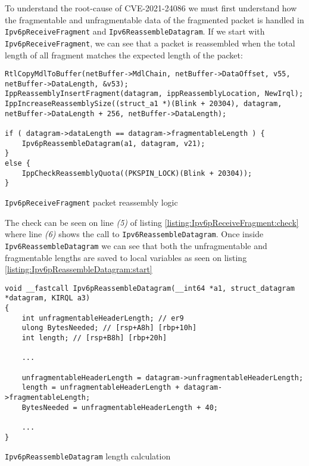 \documentclass{report}
\begin{document}
To understand the root-cause of CVE-2021-24086 we must first understand how the fragmentable and unfragmentable data of the fragmented packet is handled in \texttt{Ipv6pReceiveFragment} and \texttt{Ipv6ReassembleDatagram}. If we start with \texttt{Ipv6pReceiveFragment}, we can see that a packet is reassembled when the total length of all fragment matches the expected length of the packet:

\begin{listing}[H]
\begin{verbatim}
RtlCopyMdlToBuffer(netBuffer->MdlChain, netBuffer->DataOffset, v55, netBuffer->DataLength, &v53);
IppReassemblyInsertFragment(datagram, ippReassemblyLocation, NewIrql);
IppIncreaseReassemblySize((struct_a1 *)(Blink + 20304), datagram, netBuffer->DataLength + 256, netBuffer->DataLength);

if ( datagram->dataLength == datagram->fragmentableLength ) {
    Ipv6pReassembleDatagram(a1, datagram, v21);
}
else {
    IppCheckReassemblyQuota((PKSPIN_LOCK)(Blink + 20304));
}
\end{verbatim}
\caption{\texttt{Ipv6pReceiveFragment} packet reassembly logic}
\label{listing:Ipv6pReceiveFragment:check}
\end{listing}

The check can be seen on line \emph{(5)} of listing \ref{listing:Ipv6pReceiveFragment:check} where line \emph{(6)} shows the call to \texttt{Ipv6ReassembleDatagram}. Once inside \texttt{Ipv6ReassembleDatagram} we can see that both the unfragmentable and fragmentable lengths are saved to local variables as seen on listing \ref{listing:Ipv6pReassembleDatagram:start}

\begin{listing}[H]
\begin{verbatim}
void __fastcall Ipv6pReassembleDatagram(__int64 *a1, struct_datagram *datagram, KIRQL a3)
{
    int unfragmentableHeaderLength; // er9
    ulong BytesNeeded; // [rsp+A8h] [rbp+10h]
    int length; // [rsp+B8h] [rbp+20h]

    ...

    unfragmentableHeaderLength = datagram->unfragmentableHeaderLength;
    length = unfragmentableHeaderLength + datagram->fragmentableLength;
    BytesNeeded = unfragmentableHeaderLength + 40;

    ...
}
\end{verbatim}
\caption{\texttt{Ipv6pReassembleDatagram} length calculation}
\label{listing:Ipv6pReassembleDatagram:start}
\end{listing}
\end{document}
